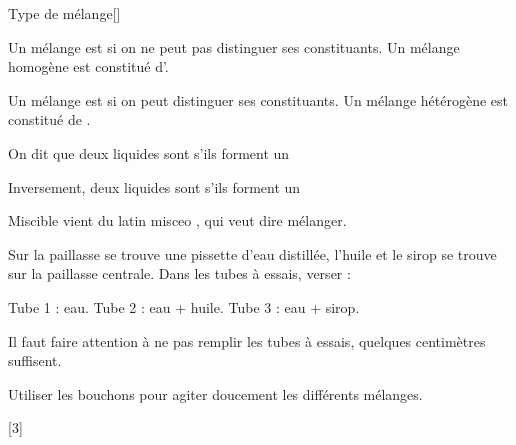 \begin{doc}{Type de mélange}[\label{doc:type_melange}]
  \begin{importants}
    Un mélange est  si on ne peut pas distinguer ses constituants.
    Un mélange homogène est constitué d'.
  \end{importants}
  
  \begin{importants}
    Un mélange est  si on peut distinguer ses constituants.
    Un mélange hétérogène est constitué de .
  \end{importants}

  \begin{importants}
    On dit que deux liquides sont  s'ils forment un 
  \end{importants}
  \begin{importants}
    Inversement, deux liquides sont  s'ils forment un 
  \end{importants}
  Miscible vient du latin \og misceo \fg, qui veut dire mélanger.
\end{doc}


\mesure
Sur la paillasse se trouve une pissette d'eau distillée, l'huile et le sirop se trouve sur la paillasse centrale.
Dans les tubes à essais, verser :
\vspace*{-8pt}
\begin{center}
  \pointCyan Tube 1 : eau.
  \pointCyan Tube 2 : eau + huile.
  \pointCyan Tube 3 : eau + sirop.
\end{center}
\vspace*{-8pt}
\attention Il faut faire attention à ne pas remplir les tubes à essais, quelques centimètres suffisent.

\mesure 
Utiliser les bouchons pour agiter doucement les différents mélanges.

%
\newpage
\vspace*{-24pt}
\pasCorrection{\vspace*{6cm}}

%
[3]

